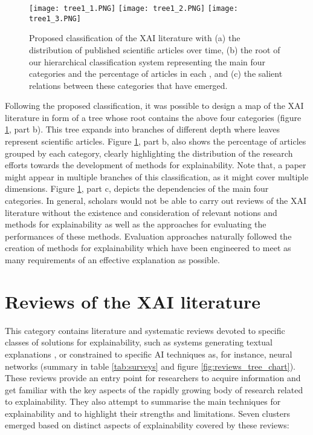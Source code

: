 \documentclass[final,1p,times]{elsarticle}
\begin{document}
\begin{figure}[!ht]
\begin{minipage}{\textwidth}
\centering
  \subcaptionbox{}
    {\texttt{[image: tree1\_1.PNG]}}
  \subcaptionbox{}
    {\texttt{[image: tree1\_2.PNG]}}
  \subcaptionbox{}
    {\texttt{[image: tree1\_3.PNG]}}
  \caption{Proposed classification of the XAI literature with (a) the distribution  of published  scientific articles over time, (b) the root of our hierarchical classification system representing the main four categories and the percentage of articles in each , and (c) the salient relations between these categories that have emerged.}
  \label{fig:tree_root}
\end{minipage}
\end{figure}


Following the proposed classification, it was possible to design a map of the XAI literature in form of a tree whose root contains the above four categories (figure \ref{fig:tree_root}, part b). This tree expands into branches of different depth where leaves represent scientific articles. Figure \ref{fig:tree_root}, part b, also shows the percentage of articles grouped by each category, clearly highlighting the distribution of the research efforts towards the development of methods for explainability. Note that, a paper might appear in multiple branches of this classification, as it might cover multiple dimensions.
Figure \ref{fig:tree_root}, part c, depicts the dependencies of the main four categories. In general, scholars would not be able to carry out reviews of the XAI literature without the existence and consideration of relevant notions and methods for explainability as well as the approaches for evaluating the performances of these methods. Evaluation approaches naturally followed the creation of methods for explainability which have been engineered to meet as many requirements of an effective explanation as possible. 

\section{Reviews of the XAI literature}\label{xaisurveys}
This category contains literature and systematic reviews devoted to specific classes of solutions for explainability, such as systems generating textual explanations \cite{miller2017explainable}, or constrained to specific AI techniques as, for instance, neural networks \cite{jacobsson2005rule} (summary in table \ref{tab:surveys} and figure \ref{fig:reviews_tree_chart}). 
These reviews provide an entry point for researchers to acquire information and get familiar with the key aspects of the rapidly growing body of research related to explainability. They also attempt to summarise the main techniques for explainability and to highlight their strengths and limitations. 
Seven clusters emerged based on distinct aspects of explainability covered by these reviews: 
\end{document}
